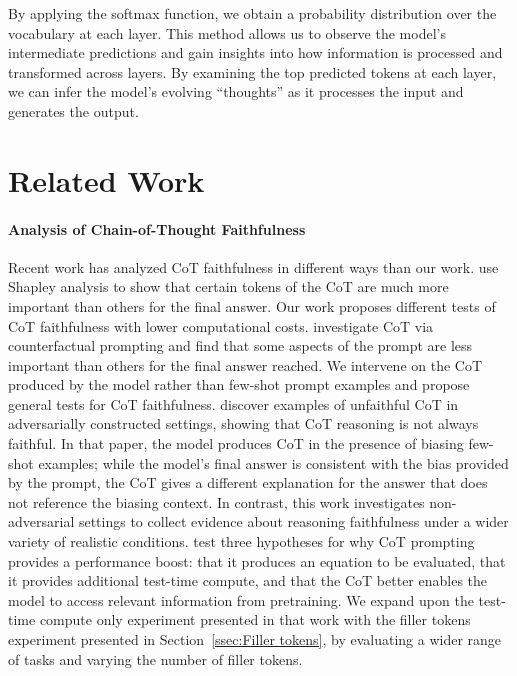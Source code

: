 \documentclass{article}
\begin{document}
By applying the softmax function, we obtain a probability distribution over the vocabulary at each layer. This method allows us to observe the model's intermediate predictions and gain insights into how information is processed and transformed across layers. By examining the top predicted tokens at each layer, we can infer the model's evolving ``thoughts'' as it processes the input and generates the output.

\newpage
\section{Related Work}

\paragraph{Analysis of Chain-of-Thought Faithfulness}
Recent work has analyzed CoT faithfulness in different ways than our work. 
\cite{gao2023shapley} use Shapley analysis to show that certain tokens of the CoT are much more important than others for the final answer. 
Our work proposes different tests of CoT faithfulness with lower computational costs.
\cite{madaan2022text} investigate CoT via counterfactual prompting and find that some aspects of the prompt are less important than others for the final answer reached.
We intervene on the CoT produced by the model rather than few-shot prompt examples and propose general tests for CoT faithfulness.
\cite{turpin2023language} discover examples of unfaithful CoT in adversarially constructed settings, showing that CoT reasoning is not always faithful. In that paper, the model produces CoT in the presence of biasing few-shot examples; while the model's final answer is consistent with the bias provided by the prompt, the CoT gives a different explanation for the answer that does not reference the biasing context. 
In contrast, this work investigates non-adversarial settings to collect evidence about reasoning faithfulness under a wider variety of realistic conditions.
\cite{wei2022chain} test three hypotheses for why CoT prompting provides a performance boost: that it produces an equation to be evaluated, that it provides additional test-time compute, and that the CoT better enables the model to access relevant information from pretraining. We expand upon the test-time compute only experiment presented in that work with the filler tokens experiment presented in Section~\ref{ssec:Filler tokens}, by evaluating a wider range of tasks and varying the number of filler tokens.
\end{document}

